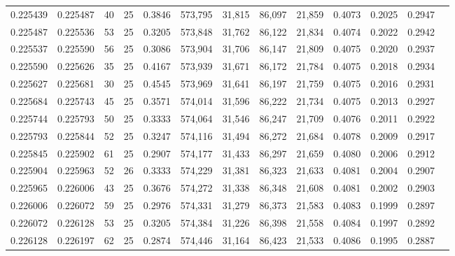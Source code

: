 \begin{tabular}{rrrrrrrrrrrrr}
0.225439 & 0.225487 &    40 &  25 &                                     0.3846 & 573,795 &  31,815 &  86,097 &  21,859 & 0.4073 & 0.2025 & 0.2947 \\
0.225487 & 0.225536 &    53 &  25 &                                     0.3205 & 573,848 &  31,762 &  86,122 &  21,834 & 0.4074 & 0.2022 & 0.2942 \\
0.225537 & 0.225590 &    56 &  25 &                                     0.3086 & 573,904 &  31,706 &  86,147 &  21,809 & 0.4075 & 0.2020 & 0.2937 \\
0.225590 & 0.225626 &    35 &  25 &                                     0.4167 & 573,939 &  31,671 &  86,172 &  21,784 & 0.4075 & 0.2018 & 0.2934 \\
0.225627 & 0.225681 &    30 &  25 &                                     0.4545 & 573,969 &  31,641 &  86,197 &  21,759 & 0.4075 & 0.2016 & 0.2931 \\
0.225684 & 0.225743 &    45 &  25 &                                     0.3571 & 574,014 &  31,596 &  86,222 &  21,734 & 0.4075 & 0.2013 & 0.2927 \\
0.225744 & 0.225793 &    50 &  25 &                                     0.3333 & 574,064 &  31,546 &  86,247 &  21,709 & 0.4076 & 0.2011 & 0.2922 \\
0.225793 & 0.225844 &    52 &  25 &                                     0.3247 & 574,116 &  31,494 &  86,272 &  21,684 & 0.4078 & 0.2009 & 0.2917 \\
0.225845 & 0.225902 &    61 &  25 &                                     0.2907 & 574,177 &  31,433 &  86,297 &  21,659 & 0.4080 & 0.2006 & 0.2912 \\
0.225904 & 0.225963 &    52 &  26 &                                     0.3333 & 574,229 &  31,381 &  86,323 &  21,633 & 0.4081 & 0.2004 & 0.2907 \\
0.225965 & 0.226006 &    43 &  25 &                                     0.3676 & 574,272 &  31,338 &  86,348 &  21,608 & 0.4081 & 0.2002 & 0.2903 \\
0.226006 & 0.226072 &    59 &  25 &                                     0.2976 & 574,331 &  31,279 &  86,373 &  21,583 & 0.4083 & 0.1999 & 0.2897 \\
0.226072 & 0.226128 &    53 &  25 &                                     0.3205 & 574,384 &  31,226 &  86,398 &  21,558 & 0.4084 & 0.1997 & 0.2892 \\
0.226128 & 0.226197 &    62 &  25 &                                     0.2874 & 574,446 &  31,164 &  86,423 &  21,533 & 0.4086 & 0.1995 & 0.2887 \\

\end{tabular}
